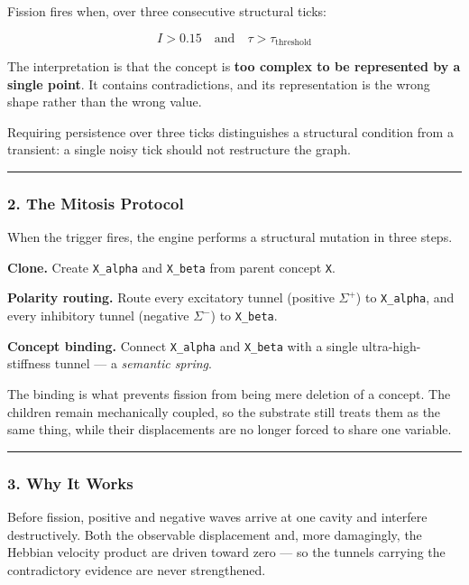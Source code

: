\documentclass[
  11pt,
  a4paper,
]{article}
\begin{document}
Fission fires when, over three consecutive structural ticks:

\[
I > 0.15 \quad\text{and}\quad \tau > \tau_{\text{threshold}}
\]

The interpretation is that the concept is \textbf{too complex to be
represented by a single point}. It contains contradictions, and its
representation is the wrong shape rather than the wrong value.

Requiring persistence over three ticks distinguishes a structural
condition from a transient: a single noisy tick should not restructure
the graph.

\begin{center}\rule{0.5\linewidth}{0.5pt}\end{center}

\subsubsection{2. The Mitosis Protocol}\label{the-mitosis-protocol}

When the trigger fires, the engine performs a structural mutation in
three steps.

\textbf{Clone.} Create \texttt{X\_alpha} and \texttt{X\_beta} from
parent concept \texttt{X}.

\textbf{Polarity routing.} Route every excitatory tunnel (positive
\(\Sigma^{+}\)) to \texttt{X\_alpha}, and every inhibitory tunnel
(negative \(\Sigma^{-}\)) to \texttt{X\_beta}.

\textbf{Concept binding.} Connect \texttt{X\_alpha} and \texttt{X\_beta}
with a single ultra-high-stiffness tunnel --- a \emph{semantic spring}.

The binding is what prevents fission from being mere deletion of a
concept. The children remain mechanically coupled, so the substrate
still treats them as the same thing, while their displacements are no
longer forced to share one variable.

\begin{center}\rule{0.5\linewidth}{0.5pt}\end{center}

\subsubsection{3. Why It Works}\label{why-it-works}

Before fission, positive and negative waves arrive at one cavity and
interfere destructively. Both the observable displacement and, more
damagingly, the Hebbian velocity product are driven toward zero --- so
the tunnels carrying the contradictory evidence are never strengthened.
\end{document}
